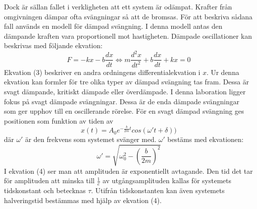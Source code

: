 \documentclass[a4paper,10pt]{article}
\begin{document}
Dock är sällan fallet i verkligheten att ett system är odämpat. Krafter från omgivningen dämpar ofta svängningar så att de bromsas. För att beskriva sådana fall används en modell för dämpad svängning. I denna modell antas den dämpande kraften vara proportionell mot hastigheten. Dämpade oscillationer kan beskrivas med följande ekvation:
\begin{equation}
	F = -kx - b\frac{dx}{dt} \Longleftrightarrow m\frac{d^2x}{dt^2} + b\frac{dx}{dt} + kx = 0
\end{equation}
Ekvation (3) beskriver en andra ordningens differentialekvation i $x$. Ur denna ekvation kan formler för tre olika typer av dämpad svängning tas fram. Dessa är svagt dämpande, kritiskt dämpade eller överdämpade. I denna laboration ligger fokus på svagt dämpade svängningar. Dessa är de enda dämpade svängningar som ger upphov till en oscillerande rörelse. För en svagt dämpad svängning ges positionen som funktion av tiden av
\begin{equation}
	x(t) = A_0e^{-\frac{b}{2m}t}cos(\omega't + \delta))
\end{equation}
där $\omega'$ är den frekvens som systemet svänger med. $\omega'$ bestäms med ekvationen:
\begin{equation}
	\omega' = \sqrt{\omega_0^2-(\frac{b}{2m})^2}
\end{equation}
I ekvation (4) ser man att amplituden är exponentiellt avtagande. Den tid det tar för amplituden att minska till $\frac{1}{e}$ av utgångsamplituden kallas för systemets tidskonstant och betecknas $\tau$. Utifrån tidskonstanten kan även systemets halveringstid bestämmas med hjälp av ekvation (4).
\\
\end{document}
